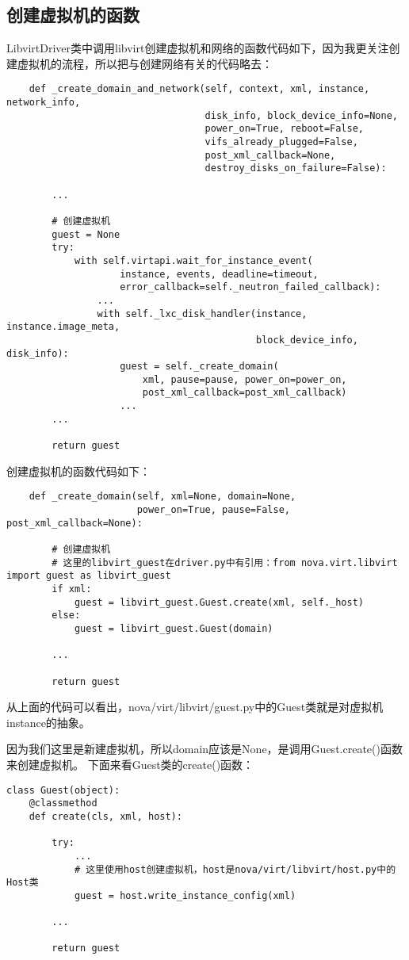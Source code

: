 \documentclass[a4paper,left=1.5cm,right=1.5cm,11pt]{article}
\begin{document}
\subsection{创建虚拟机的函数}
	LibvirtDriver类中调用libvirt创建虚拟机和网络的函数代码如下，因为我更关注创建虚拟机的流程，所以把与创建网络有关的代码略去：
	\begin{lstlisting}
	def _create_domain_and_network(self, context, xml, instance, network_info,
                                   disk_info, block_device_info=None,
                                   power_on=True, reboot=False,
                                   vifs_already_plugged=False,
                                   post_xml_callback=None,
                                   destroy_disks_on_failure=False):

        ...

		# 创建虚拟机
        guest = None
        try:
            with self.virtapi.wait_for_instance_event(
                    instance, events, deadline=timeout,
                    error_callback=self._neutron_failed_callback):
                ...
                with self._lxc_disk_handler(instance, instance.image_meta,
                                            block_device_info, disk_info):
                    guest = self._create_domain(
                        xml, pause=pause, power_on=power_on,
                        post_xml_callback=post_xml_callback)
					...
        ...

        return guest
	\end{lstlisting}

	创建虚拟机的函数代码如下：
	\begin{lstlisting}
	def _create_domain(self, xml=None, domain=None,
                       power_on=True, pause=False, post_xml_callback=None):
		
		# 创建虚拟机
		# 这里的libvirt_guest在driver.py中有引用：from nova.virt.libvirt import guest as libvirt_guest
        if xml:
            guest = libvirt_guest.Guest.create(xml, self._host)
        else:
            guest = libvirt_guest.Guest(domain)

        ...

        return guest
	\end{lstlisting}

	从上面的代码可以看出，nova/virt/libvirt/guest.py中的Guest类就是对虚拟机instance的抽象。\par

	因为我们这里是新建虚拟机，所以domain应该是None，是调用Guest.create()函数来创建虚拟机。
	下面来看Guest类的create()函数：
	\begin{lstlisting}
class Guest(object):
	@classmethod
    def create(cls, xml, host):
        
        try:
            ...
			# 这里使用host创建虚拟机，host是nova/virt/libvirt/host.py中的Host类
            guest = host.write_instance_config(xml)
        
		...

        return guest
	\end{lstlisting}
\end{document}
